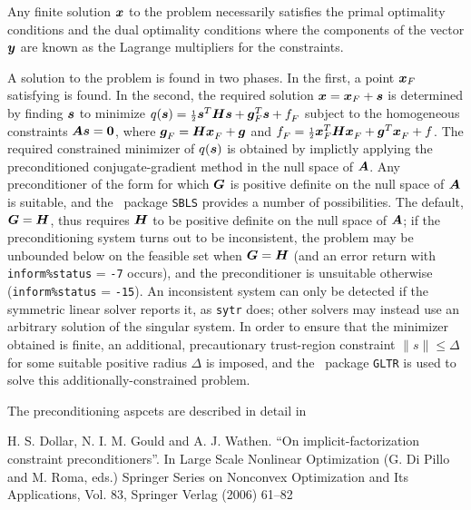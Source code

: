 \documentclass{galahad}
\begin{document}

\galmethod
Any finite solution ${\bm{x}}$ to the problem necessarily satisfies 
the primal optimality conditions
and the dual optimality conditions
where the components of the vector ${\bm{y}}$ are 
known as the Lagrange multipliers for the constraints.

A solution to the problem is found in two phases.
In the first, a point ${\bm{x}}_F$ satisfying  is found.
In the second, the required solution ${\bm{x}} = {\bm{x}}_F + {\bm{s}}$
is determined by finding ${\bm{s}}$ to minimize 
$q({\bm{s}}) = {\scriptstyle \frac{1}{2}} {\bm{s}}^T {\bm{H}} {\bm{s}} + {\bm{g}}_F^T {\bm{s}} + f_F^{}$
subject to the homogeneous constraints ${\bm{A}} {\bm{s}} = {\bm{0}}$,
where ${\bm{g}}_F^{} = {\bm{H}} {\bm{x}}_F^{} + {\bm{g}}$ and 
$f_F^{} = {\scriptstyle \frac{1}{2}} {\bm{x}}_F^T {\bm{H}} {\bm{x}}_F^{} + {\bm{g}}^T {\bm{x}}_F^{} + f$.
The required constrained minimizer of $q({\bm{s}})$ is obtained
by implictly applying the preconditioned conjugate-gradient method
in the null space of ${\bm{A}}$. Any preconditioner of the form
for which ${\bm{G}}$ is positive definite on the null space of ${\bm{A}}$
is suitable, and the \galahad\ package {\tt SBLS}
provides a number of possibilities. The default, ${\bm{G}} = {\bm{H}}$, thus
requires ${\bm{H}}$ to be positive definite on the null space of ${\bm{A}}$;
if the preconditioning system turns out to be inconsistent, the problem
may be unbounded below on the feasible set when ${\bm{G}} = {\bm{H}}$ (and an
error return with {\tt inform\%status} = {\tt -7} occurs), and the
preconditioner is unsuitable otherwise ({\tt inform\%status} = {\tt -15}).
An inconsistent system can only be detected if the symmetric linear
solver reports it, as {\tt sytr} does; other solvers may instead use an
arbitrary solution of the singular system. In order to ensure that the
minimizer obtained is finite, an additional, precautionary trust-region
constraint $\|s\| \leq \Delta$ for some suitable positive radius 
$\Delta$ is imposed, and the \galahad\ package {\tt GLTR} is used to solve 
this additionally-constrained problem.
\vspace*{1mm}

\galreferences
\vspace*{1mm}

\noindent
The preconditioning aspcets are described in detail in
\vspace*{1mm}

\noindent
H. S. Dollar, N. I. M. Gould and A. J. Wathen.
``On implicit-factorization constraint preconditioners''.
In  Large Scale Nonlinear Optimization (G. Di Pillo and M. Roma, eds.)
Springer Series on Nonconvex Optimization and Its Applications, Vol. 83,
Springer Verlag (2006) 61--82
\end{document}

